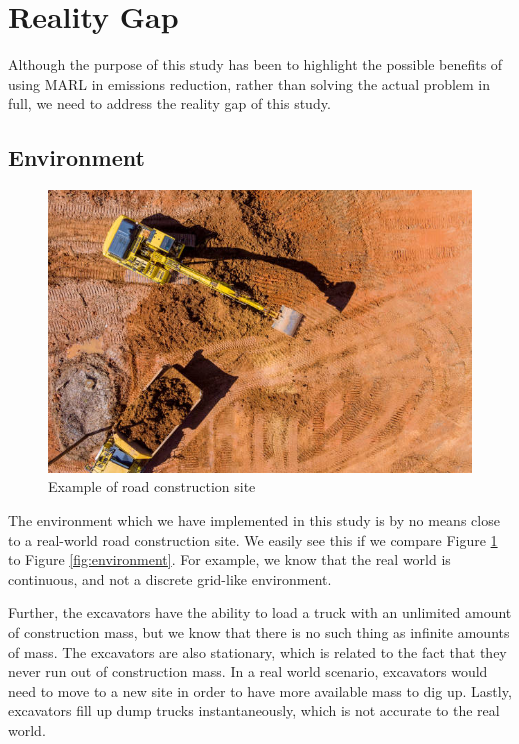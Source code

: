 \documentclass[conference]{IEEEtran}
\begin{document}
	\section{Reality Gap}
	Although the purpose of this study has been to highlight the possible benefits of using MARL in
	emissions reduction, rather than solving the actual problem in full, we need to address the reality
	gap of this study.



	\subsection{Environment}
	\begin{figure}[!ht]
		\includegraphics[width=\columnwidth]{graphs/construction_site.jpg}
		\caption{Example of road construction site}
		\label{fig:construction-site}
	\end{figure}

	The environment which we have implemented in this study is by no means close to a
	real-world road construction site. We easily see this if we compare Figure \ref{fig:construction-site}
	to Figure \ref{fig:environment}. For example, we know that the real world is continuous, and not a discrete
	grid-like environment.

	Further, the excavators have the ability to load a truck with an unlimited amount of construction mass,
	but we know that there is no such thing as infinite amounts of mass. The excavators are also stationary,
	which is related to the fact that they never run out of construction mass. In a real world scenario,
	excavators would need to move to a new site in order to have more available mass to dig up. Lastly,
	excavators fill up dump trucks instantaneously, which is not accurate to the real world.
\end{document}
